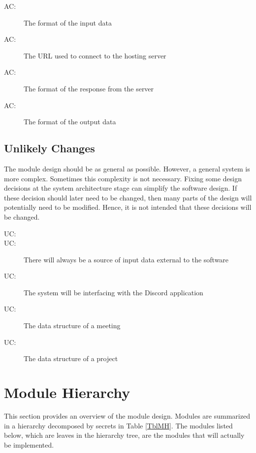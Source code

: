 \documentclass[12pt, titlepage]{article}
\newcounter{acnum}
\newcommand{\actheacnum}{AC\theacnum}
\newcounter{ucnum}
\newcommand{\uctheucnum}{UC\theucnum}
\begin{document}
\begin{description}
\item[ \actheacnum \label{acInput}:] The format of the input data
\item[ \actheacnum \label{acInput}:] The URL used to connect to the hosting server
\item[ \actheacnum \label{acInput}:] The format of the response from the server
\item[ \actheacnum \label{acInput}:] The format of the output data
\end{description}

\subsection{Unlikely Changes} \label{SecUchange}

The module design should be as general as possible. However, a general system is
more complex. Sometimes this complexity is not necessary. Fixing some design
decisions at the system architecture stage can simplify the software design. If
these decision should later need to be changed, then many parts of the design
will potentially need to be modified. Hence, it is not intended that these
decisions will be changed.

\begin{description}
\item[ \uctheucnum \label{ucIO}:] 
\item[ \uctheucnum \label{ucInput}:] There will always be a source of input data external to the software
\item[ \uctheucnum \label{ucInput}:] The system will be interfacing with the Discord application
\item[ \uctheucnum \label{ucInput}:] The data structure of a meeting
\item[ \uctheucnum \label{ucInput}:] The data structure of a project
\end{description}

\section{Module Hierarchy} \label{SecMH}
This section provides an overview of the module design. Modules are summarized
in a hierarchy decomposed by secrets in Table \ref{TblMH}. The modules listed
below, which are leaves in the hierarchy tree, are the modules that will
actually be implemented.
\end{document}
